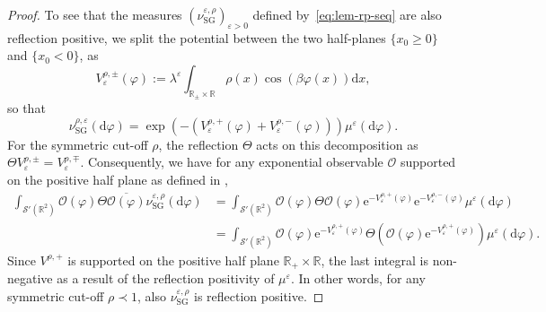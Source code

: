 \documentclass[11pt, a4paper]{scrartcl}
\numberwithin{equation}{section}
\theoremstyle{plain}
\theoremstyle{remark}
\newcommand{\assign}{:=}
\newcommand{\mathd}{\mathrm{d}}
\newcommand{\mathe}{\mathrm{e}}
\newcommand{\tmop}[1]{\ensuremath{\operatorname{#1}}}
\newcommand{\tmtextbf}[1]{\text{{\bfseries{#1}}}}
\begin{document}
\begin{proof}
  To see that the measures $(\nu_{\tmop{SG}}^{\varepsilon,
  \rho})_{\varepsilon > 0}$ defined by~\eqref{eq:lem-rp-seq} are also
  reflection positive, we split the potential between the two half-planes $\{
  x_0 \geqslant 0 \}$ and $\{ x_0 < 0 \}$, as
  \[ V_{\varepsilon}^{\rho, \pm} (\varphi) \assign \lambda^{\varepsilon} 
     \int_{\mathbb{R}_{\pm} \times \mathbb{R}} \rho (x) \cos (\beta \varphi
     (x)) \mathd x, \]
  so that
  \[ \nu_{\tmop{SG}}^{\rho, \varepsilon} (\mathd \varphi) = \exp (-
     (V_{\varepsilon}^{\rho, +} (\varphi) + V_{\varepsilon}^{\rho, -}
     (\varphi))) \mu^{\varepsilon} (\mathd \varphi) . \]
  For the symmetric cut-off $\rho$, the reflection $\Theta$ acts on this
  decomposition as $\Theta V_{\varepsilon}^{\rho, \pm} =
  V_{\varepsilon}^{\rho, \mp}$. Consequently, we have for any exponential
  observable $\mathcal{O}$ supported on the positive half plane as defined in
  \tmtextbf{(OS3)}, 
  \[ \begin{aligned}
       \int_{\mathcal{S}' (\mathbb{R}^2)} \mathcal{O} (\varphi) \Theta
       \overline{\mathcal{O} (\varphi)} \nu_{\tmop{SG}}^{\varepsilon, \rho}
       (\mathd \varphi) &= \int_{\mathcal{S}' (\mathbb{R}^2)} \mathcal{O}
       (\varphi) \Theta \mathcal{O} (\varphi) \mathe^{- V_{\varepsilon}^{\rho,
       +} (\varphi)} \mathe^{- V_{\varepsilon}^{\rho, -} (\varphi)}
       \mu^{\varepsilon} (\mathd \varphi)\\
       &= \int_{\mathcal{S}' (\mathbb{R}^2)} \mathcal{O} (\varphi)
       \mathe^{- V_{\varepsilon}^{\rho, +} (\varphi)} \Theta (\mathcal{O}
       (\varphi) \mathe^{- V_{\varepsilon}^{\rho, +} (\varphi)})
       \mu^{\varepsilon} (\mathd \varphi) .
     \end{aligned} \]
  Since $V^{\rho, +}$ is supported on the positive half plane $\mathbb{R}_+
  \times \mathbb{R}$, the last integral is non-negative as a result of the
  reflection positivity of $\mu^{\varepsilon}$. In other words, for any
  symmetric cut-off $\rho \prec 1$, also $\nu_{\tmop{SG}}^{\varepsilon, \rho}$ is
  reflection positive.
\end{proof}
\end{document}
